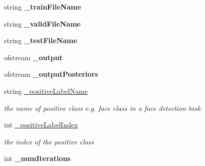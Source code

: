 \begin{DoxyCompactItemize}
\item 
\hypertarget{classMultiBoost_1_1VJCascadeLearner_a0dab57fe35ffbe2d117f1ced2b7592b0}{string {\bfseries \-\_\-train\-File\-Name}}\label{classMultiBoost_1_1VJCascadeLearner_a0dab57fe35ffbe2d117f1ced2b7592b0}

\item 
\hypertarget{classMultiBoost_1_1VJCascadeLearner_a24f1eb74603af03489efbfecb41836cb}{string {\bfseries \-\_\-valid\-File\-Name}}\label{classMultiBoost_1_1VJCascadeLearner_a24f1eb74603af03489efbfecb41836cb}

\item 
\hypertarget{classMultiBoost_1_1VJCascadeLearner_acf20de04f26cbca31d388127739457c1}{string {\bfseries \-\_\-test\-File\-Name}}\label{classMultiBoost_1_1VJCascadeLearner_acf20de04f26cbca31d388127739457c1}

\item 
\hypertarget{classMultiBoost_1_1VJCascadeLearner_ac12743f772c22fc7443041eed9efba07}{ofstream {\bfseries \-\_\-output}}\label{classMultiBoost_1_1VJCascadeLearner_ac12743f772c22fc7443041eed9efba07}

\item 
\hypertarget{classMultiBoost_1_1VJCascadeLearner_a059085987082b89f3766a4a607c4c30d}{ofstream {\bfseries \-\_\-output\-Posteriors}}\label{classMultiBoost_1_1VJCascadeLearner_a059085987082b89f3766a4a607c4c30d}

\item 
\hypertarget{classMultiBoost_1_1VJCascadeLearner_add978cbb5561f3635c05bbc1f0d07718}{string \hyperlink{classMultiBoost_1_1VJCascadeLearner_add978cbb5561f3635c05bbc1f0d07718}{\-\_\-positive\-Label\-Name}}\label{classMultiBoost_1_1VJCascadeLearner_add978cbb5561f3635c05bbc1f0d07718}

\begin{DoxyCompactList}\small\item\em the name of positive class e.\-g. face class in a face detection task \end{DoxyCompactList}\item 
\hypertarget{classMultiBoost_1_1VJCascadeLearner_a400f364b8ec20a89d7dc8b433796204f}{int \hyperlink{classMultiBoost_1_1VJCascadeLearner_a400f364b8ec20a89d7dc8b433796204f}{\-\_\-positive\-Label\-Index}}\label{classMultiBoost_1_1VJCascadeLearner_a400f364b8ec20a89d7dc8b433796204f}

\begin{DoxyCompactList}\small\item\em the index of the positive class \end{DoxyCompactList}\item 
\hypertarget{classMultiBoost_1_1VJCascadeLearner_a9ec824b816342c1301d4b0709b7ad048}{int {\bfseries \-\_\-num\-Iterations}}\label{classMultiBoost_1_1VJCascadeLearner_a9ec824b816342c1301d4b0709b7ad048}


\end{DoxyCompactItemize}
